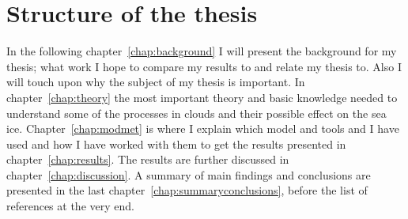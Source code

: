\section{Structure of the thesis}
In the following chapter~\ref{chap:background} I will present the background for my thesis; what work I hope to compare my results to and relate my thesis to. Also I will touch upon why the subject of my thesis is important. In chapter~\ref{chap:theory} the most important theory and basic knowledge needed to understand some of the processes in clouds and their possible effect on the sea ice. Chapter~\ref{chap:modmet} is where I explain which model and tools and  I have used and how I have worked with them to get the results presented in chapter~\ref{chap:results}. The results are further discussed in chapter~\ref{chap:discussion}. A summary of main findings and conclusions are presented in the last chapter~\ref{chap:summaryconclusions}, before the list of references at the very end.


